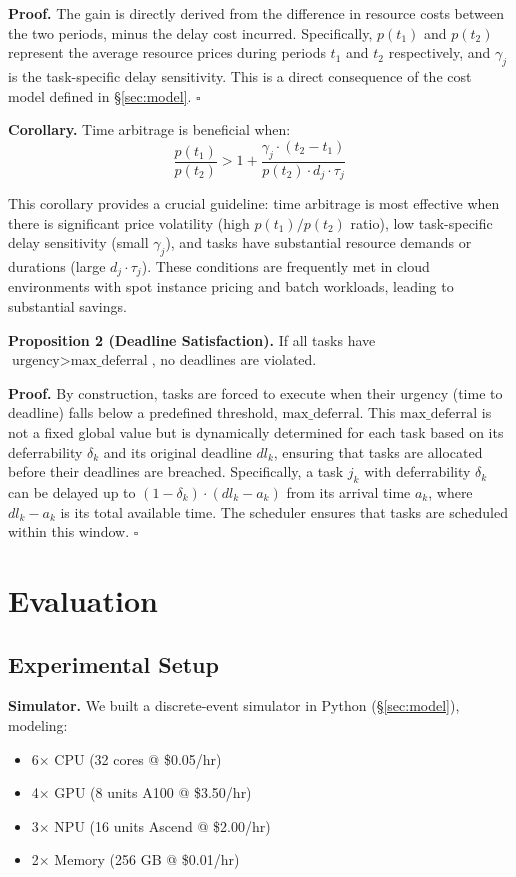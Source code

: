 \documentclass[10pt,conference]{IEEEtran}
\begin{document}
\textbf{Proof.} The gain is directly derived from the difference in resource costs between the two periods, minus the delay cost incurred. Specifically, $p(t_1)$ and $p(t_2)$ represent the average resource prices during periods $t_1$ and $t_2$ respectively, and $\gamma_j$ is the task-specific delay sensitivity. This is a direct consequence of the cost model defined in \S\ref{sec:model}. $\square$

\textbf{Corollary.} Time arbitrage is beneficial when:
\begin{equation}
\frac{p(t_1)}{p(t_2)} > 1 + \frac{\gamma_j \cdot (t_2 - t_1)}{p(t_2) \cdot d_j \cdot \tau_j}
\end{equation}

This corollary provides a crucial guideline: time arbitrage is most effective when there is significant price volatility (high $p(t_1)/p(t_2)$ ratio), low task-specific delay sensitivity (small $\gamma_j$), and tasks have substantial resource demands or durations (large $d_j \cdot \tau_j$). These conditions are frequently met in cloud environments with spot instance pricing and batch workloads, leading to substantial savings.

\textbf{Proposition 2 (Deadline Satisfaction).} If all tasks have $\text{urgency} > \text{max\_deferral}$, no deadlines are violated.

\textbf{Proof.} By construction, tasks are forced to execute when their urgency (time to deadline) falls below a predefined threshold, $\text{max\_deferral}$. This $\text{max\_deferral}$ is not a fixed global value but is dynamically determined for each task based on its deferrability $\delta_k$ and its original deadline $dl_k$, ensuring that tasks are allocated before their deadlines are breached. Specifically, a task $j_k$ with deferrability $\delta_k$ can be delayed up to $(1 - \delta_k) \cdot (dl_k - a_k)$ from its arrival time $a_k$, where $dl_k - a_k$ is its total available time. The scheduler ensures that tasks are scheduled within this window. $\square$

\section{Evaluation}
\label{sec:evaluation}

\subsection{Experimental Setup}

\textbf{Simulator.} We built a discrete-event simulator in Python (\S\ref{sec:model}), modeling:
\begin{itemize}
    \item 6$\times$ CPU (32 cores @ \$0.05/hr)
    \item 4$\times$ GPU (8 units A100 @ \$3.50/hr)
    \item 3$\times$ NPU (16 units Ascend @ \$2.00/hr)
    \item 2$\times$ Memory (256 GB @ \$0.01/hr)
\end{itemize}
\end{document}
